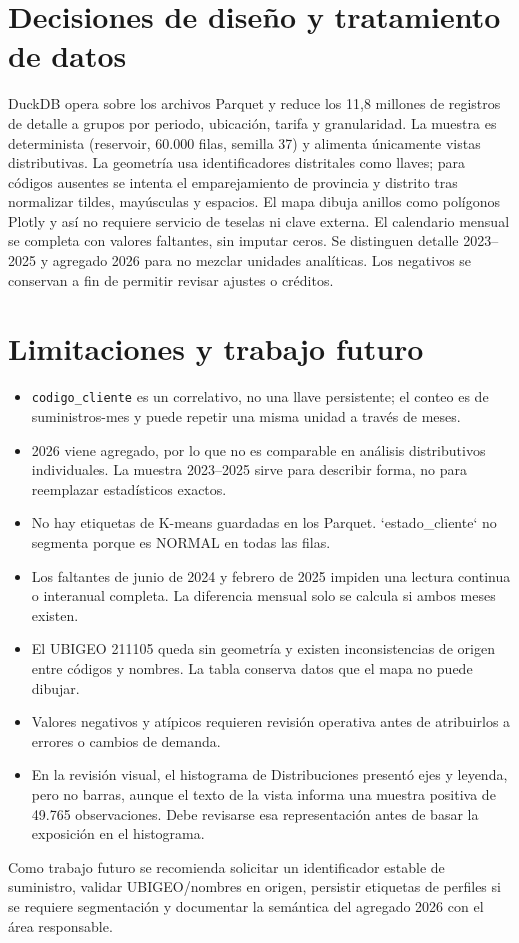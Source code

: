 \documentclass[11pt,a4paper]{article}
\begin{document}
\section{Decisiones de diseño y tratamiento de datos}
DuckDB opera sobre los archivos Parquet y reduce los 11,8 millones de registros de detalle a grupos por periodo, ubicación, tarifa y granularidad. La muestra es determinista (reservoir, 60.000 filas, semilla 37) y alimenta únicamente vistas distributivas. La geometría usa identificadores distritales como llaves; para códigos ausentes se intenta el emparejamiento de provincia y distrito tras normalizar tildes, mayúsculas y espacios. El mapa dibuja anillos como polígonos Plotly y así no requiere servicio de teselas ni clave externa. El calendario mensual se completa con valores faltantes, sin imputar ceros. Se distinguen detalle 2023--2025 y agregado 2026 para no mezclar unidades analíticas. Los negativos se conservan a fin de permitir revisar ajustes o créditos.

\section{Limitaciones y trabajo futuro}
\begin{itemize}
\item \texttt{codigo\_cliente} es un correlativo, no una llave persistente; el conteo es de suministros-mes y puede repetir una misma unidad a través de meses.
\item 2026 viene agregado, por lo que no es comparable en análisis distributivos individuales. La muestra 2023--2025 sirve para describir forma, no para reemplazar estadísticos exactos.
\item No hay etiquetas de K-means guardadas en los Parquet. `estado_cliente` no segmenta porque es NORMAL en todas las filas.
\item Los faltantes de junio de 2024 y febrero de 2025 impiden una lectura continua o interanual completa. La diferencia mensual solo se calcula si ambos meses existen.
\item El UBIGEO 211105 queda sin geometría y existen inconsistencias de origen entre códigos y nombres. La tabla conserva datos que el mapa no puede dibujar.
\item Valores negativos y atípicos requieren revisión operativa antes de atribuirlos a errores o cambios de demanda.
\item En la revisión visual, el histograma de Distribuciones presentó ejes y leyenda, pero no barras, aunque el texto de la vista informa una muestra positiva de 49.765 observaciones. Debe revisarse esa representación antes de basar la exposición en el histograma.
\end{itemize}
Como trabajo futuro se recomienda solicitar un identificador estable de suministro, validar UBIGEO/nombres en origen, persistir etiquetas de perfiles si se requiere segmentación y documentar la semántica del agregado 2026 con el área responsable.
\end{document}
